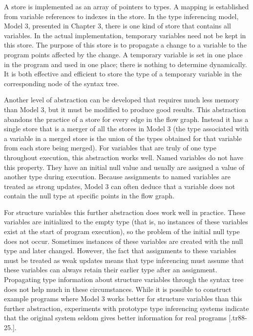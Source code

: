 A store is implemented as an array of pointers to types. A mapping is
established from variable references to indexes in the store. In the
type inferencing model, Model 3, presented in Chapter 3, there is one
kind of store that contains all variables. In the actual
implementation, temporary variables need not be kept in this
store. The purpose of this store is to propagate a change to a
variable to the program points affected by the change. A temporary
variable is set in one place in the program and used in one place;
there is nothing to determine dynamically. It is both effective and
efficient to store the type of a temporary variable in the
corresponding node of the syntax tree.

Another level of abstraction can be developed that requires much less
memory than Model 3, but it must be modified to produce good
results. This abstraction abandons the practice of a store for every
edge in the flow graph. Instead it has a single store that is a merger
of all the stores in Model 3 (the type associated with a variable in a
merged store is the union of the types obtained for that variable from
each store being merged). For variables that are truly of one type
throughout execution, this abstraction works well. Named variables do
not have this property. They have an initial null value and usually
are assigned a value of another type during execution. Because
assignments to named variables are treated as strong updates, Model 3
can often deduce that a variable does not contain the null type at
specific points in the flow graph.

For structure variables this further abstraction does work well in
practice. These variables are initialized to the empty type (that is,
no instances of these variables exist at the start of program
execution), so the problem of the initial null type does not
occur. Sometimes instances of these variables are created with the
null type and later changed. However, the fact that assignments to
these variables must be treated as weak updates means that type
inferencing must assume that these variables can always retain their
earlier type after an assignment. Propagating type information about
structure variables through the syntax tree does not help much in
these circumstances. While it is possible to construct example
programs where Model 3 works better for structure variables than this
further abstraction, experiments with prototype type inferencing
systems indicate that the original system seldom gives better
information for real programs [.tr88-25.].

